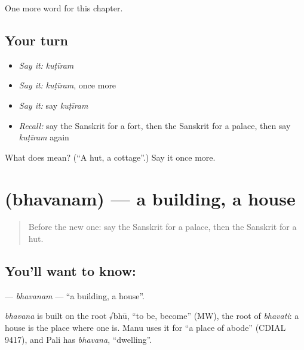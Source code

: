 \begin{grammarlens}[title={What you've built}]
One more word for this chapter.
\end{grammarlens}

\subsection*{Your turn}
\begin{itemize}
\raggedright
  \item \emph{Say it:} \emph{kuṭīram}
  \item \emph{Say it:} \emph{kuṭīram}, once more
  \item \emph{Say it:} say \emph{kuṭīram}
  \item \emph{Recall:} say the Sanskrit for a fort, then the Sanskrit for a palace, then say \emph{kuṭīram} again
\end{itemize}

\begin{tcolorbox}[breakable,colback=teal!4,colframe=teal!35!black,title={Before you move on}]
What does  mean? (\textquotedblleft{}A hut, a cottage\textquotedblright{}.) Say it once more.
\end{tcolorbox}
\section[\texorpdfstring{\sk{भवनम्} (bhavanam)}{भवनम् (bhavanam)}]{ (bhavanam) — a building, a house}

\label{lesson:SA-C250-bhavanam}



\begin{quote}
Before the new one: say the Sanskrit for a palace, then the Sanskrit for a hut.
\end{quote}

\subsection*{You'll want to know: }
\textbf{} — \emph{bhavanam} — \textquotedblleft{}a building, a house\textquotedblright{}.

\begin{cousinweb}
\emph{bhavana} is built on the root √bhū, \textquotedblleft{}to be, become\textquotedblright{} (MW), the root of \emph{bhavati}: a house is the place where one is. Manu uses it for \textquotedblleft{}a place of abode\textquotedblright{} (CDIAL 9417), and Pali has \emph{bhavana}, \textquotedblleft{}dwelling\textquotedblright{}.
\end{cousinweb}

